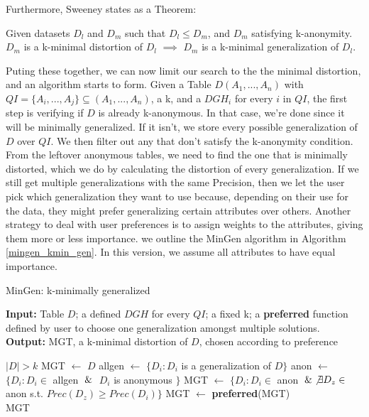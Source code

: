Furthermore, Sweeney states as a Theorem: 
\begin{thm}\cite{kanon_algos}
    Given datasets $D_l$ and $D_m$ such that $D_l \leq D_m$, and $D_m$ satisfying k-anonymity. $D_m$ is a k-minimal distortion of $D_l$ $\implies$ $D_m$ is a k-minimal generalization of $D_l$.
\end{thm}


Puting these together, we can now limit our search to the the minimal distortion, and an algorithm starts to form. Given a Table $D(A_1,...,A_n)$ with $QI = \{A_i,...,A_j\} \subseteq (A_1,...,A_n)$, a k, and a $DGH_i$ for every $i$ in $QI$, the first step is verifying if $D$ is already k-anonymous. In that case, we're done since it will be minimally generalized. If it isn't, we store every possible generalization of $D$ over $QI$. We then filter out any that don't satisfy the k-anonymity condition. From the leftover anonymous tables, we need to find the one that is minimally distorted, which we do by calculating the distortion of every generalization. If we still get multiple generalizations with the same Precision, then we let the user pick which generalization they want to use because, depending on their use for the data, they might prefer generalizing certain attributes over others. Another strategy to deal with user preferences is to assign weights to the attributes, giving them more or less importance. we outline the MinGen algorithm in Algorithm \ref{mingen_kmin_gen}. In this version, we assume all attributes to have equal importance.

\begin{algorithm}
\caption{MinGen: k-minimally generalized}
\label{mingen_kmin_gen}
\textbf{Input:} Table $D$; a defined $DGH$ for every $QI$; a fixed k; a \textbf{preferred} function defined by user to choose one generalization amongst multiple solutions.\\
\textbf{Output:} MGT, a k-minimal distortion of $D$, chosen according to preference
\begin{algorithmic} %
    \Ensure $|D| > k$
        \State MGT $\leftarrow$ $D$
    \Else
        \State allgen $\leftarrow$ $\{D_i: D_i$ is a generalization of $D\}$
        \State anon $\leftarrow$ $\{D_i: D_i \in$ allgen $\And$ $D_i$ is anonymous $\}$
        \State MGT $\leftarrow$ $\{D_i: D_i \in$ anon $\And \not\exists D_z \in$ anon s.t. $Prec(D_z) \geq Prec(D_i)\}$
        \State MGT $\leftarrow$ \textbf{preferred}(MGT)
    \EndIf \\
    \Return MGT
    
    
\end{algorithmic}
\end{algorithm}

